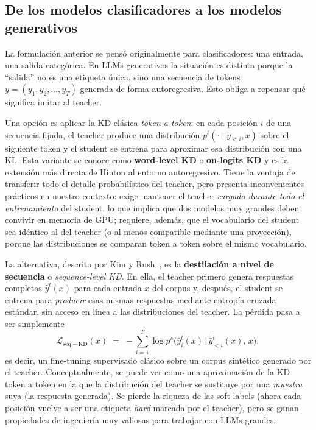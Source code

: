 \documentclass[11pt,a4paper]{article}
\begin{document}
\subsection{De los modelos clasificadores a los modelos generativos}

La formulación anterior se pensó originalmente para clasificadores: una entrada, una salida categórica. En LLMs generativos la situación es distinta porque la ``salida'' no es una etiqueta única, sino una secuencia de tokens $y = (y_1, y_2, \dots, y_T)$ generada de forma autoregresiva. Esto obliga a repensar qué significa imitar al teacher.

Una opción es aplicar la KD clásica \emph{token a token}: en cada posición $i$ de una secuencia fijada, el teacher produce una distribución $p^t(\cdot \mid y_{<i}, x)$ sobre el siguiente token y el student se entrena para aproximar esa distribución con una KL. Esta variante se conoce como \textbf{word-level KD} o \textbf{on-logits KD} y es la extensión más directa de Hinton al entorno autoregresivo. Tiene la ventaja de transferir todo el detalle probabilístico del teacher, pero presenta inconvenientes prácticos en nuestro contexto: exige mantener el teacher \emph{cargado durante todo el entrenamiento} del student, lo que implica que dos modelos muy grandes deben convivir en memoria de GPU; requiere, además, que el vocabulario del student sea idéntico al del teacher (o al menos compatible mediante una proyección), porque las distribuciones se comparan token a token sobre el mismo vocabulario.

La alternativa, descrita por Kim y Rush~\cite{kim2016sequence}, es la \textbf{destilación a nivel de secuencia} o \textit{sequence-level KD}. En ella, el teacher primero genera respuestas completas $\hat{y}^t(x)$ para cada entrada $x$ del corpus y, después, el student se entrena para \emph{producir} esas mismas respuestas mediante entropía cruzada estándar, sin acceso en línea a las distribuciones del teacher. La pérdida pasa a ser simplemente
\[
\mathcal{L}_{\mathrm{seq-KD}}(x) \;=\; -\sum_{i=1}^{T} \log p^s\!\big(\hat{y}^t_i(x)\,\big|\,\hat{y}^t_{<i}(x),\, x\big),
\]
es decir, un fine-tuning supervisado clásico sobre un corpus sintético generado por el teacher. Conceptualmente, se puede ver como una aproximación de la KD token a token en la que la distribución del teacher se sustituye por una \emph{muestra} suya (la respuesta generada). Se pierde la riqueza de las soft labels (ahora cada posición vuelve a ser una etiqueta \emph{hard} marcada por el teacher), pero se ganan propiedades de ingeniería muy valiosas para trabajar con LLMs grandes.
\end{document}
